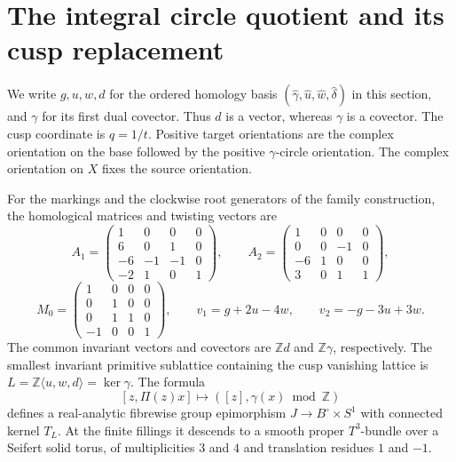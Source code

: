 \section{The integral circle quotient and its cusp replacement}\hypertarget{tag-02OO}{}\label{mapsI:circle-quotient}

We write $g,u,w,d$ for the ordered homology basis
$(\widehat\gamma,\widehat u,\widehat w,\widehat\delta)$ in this
section, and $\gamma$ for its first dual covector.  Thus $d$ is a
vector, whereas $\gamma$ is a covector.  The cusp coordinate is
$q=1/t$.  Positive target orientations are the complex orientation
on the base followed by the positive $\gamma$-circle orientation.
The complex orientation on $X$ fixes the source orientation.

\begin{proposition}\hypertarget{tag-02PA}{}\label{mapsI:src:A.1.1}

For the markings and the clockwise root generators of the family construction,
the homological matrices and twisting vectors are
\[
 A_1=\begin{pmatrix}1&0&0&0\\6&0&1&0\\-6&-1&-1&0\\-2&1&0&1\end{pmatrix},
 \qquad
 A_2=\begin{pmatrix}1&0&0&0\\0&0&-1&0\\-6&1&0&0\\3&0&1&1\end{pmatrix},
\]
\[
 M_0=\begin{pmatrix}1&0&0&0\\0&1&0&0\\0&1&1&0\\-1&0&0&1\end{pmatrix},
 \qquad v_1=g+2u-4w,\qquad v_2=-g-3u+3w.
\]
The common invariant vectors and covectors are $\mathbb Zd$ and
$\mathbb Z\gamma$, respectively.  The smallest invariant primitive
sublattice containing the cusp vanishing lattice is
$L=\mathbb Z\langle u,w,d\rangle=\ker\gamma$.
The formula
\[
 [z,\Pi(z)x]\longmapsto([z],\gamma(x)\bmod\mathbb Z)
 \label{mapsI:quotient-eq-1}
\]
defines a real-analytic fibrewise group epimorphism
$J\longrightarrow B^\circ\times S^1$ with connected kernel $T_L$.
At the finite fillings it descends to a smooth proper $T^3$-bundle
over a Seifert solid torus, of multiplicities $3$ and $4$ and
translation residues $1$ and $-1$.
\end{proposition}



